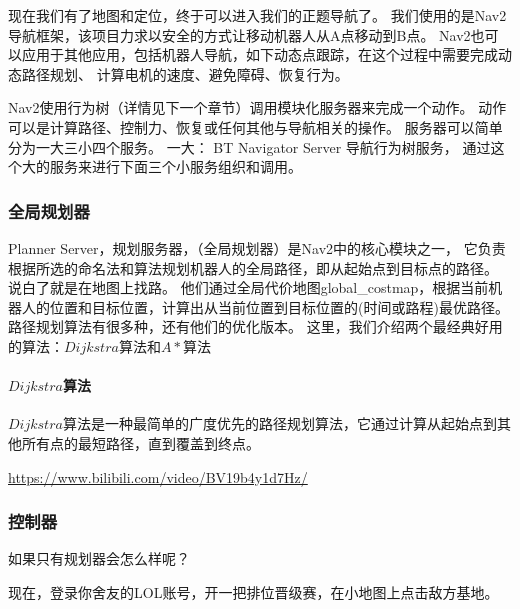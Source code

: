 现在我们有了地图和定位，终于可以进入我们的正题导航了。
我们使用的是Nav2导航框架，该项目力求以安全的方式让移动机器人从A点移动到B点。
Nav2也可以应用于其他应用，包括机器人导航，如下动态点跟踪，在这个过程中需要完成动态路径规划、
计算电机的速度、避免障碍、恢复行为。

Nav2使用行为树（详情见下一个章节）调用模块化服务器来完成一个动作。
动作可以是计算路径、控制力、恢复或任何其他与导航相关的操作。
服务器可以简单分为一大三小四个服务。
一大：
BT Navigator Server 导航行为树服务，
通过这个大的服务来进行下面三个小服务组织和调用。
\subsubsection{全局规划器}

Planner Server，规划服务器，（全局规划器）是Nav2中的核心模块之一，
它负责根据所选的命名法和算法规划机器人的全局路径，即从起始点到目标点的路径。
说白了就是在地图上找路。
他们通过全局代价地图global\_costmap，根据当前机器人的位置和目标位置，计算出从当前位置到目标位置的(时间或路程)最优路径。
路径规划算法有很多种，还有他们的优化版本。
这里，我们介绍两个最经典好用的算法：$Dijkstra$算法和$A*$算法
\paragraph{$Dijkstra$算法}
$Dijkstra$算法是一种最简单的广度优先的路径规划算法，它通过计算从起始点到其他所有点的最短路径，直到覆盖到终点。

\url{https://www.bilibili.com/video/BV19b4y1d7Hz/}


\subsubsection{控制器}
如果只有规划器会怎么样呢？

现在，登录你舍友的LOL账号，开一把排位晋级赛，在小地图上点击敌方基地。

